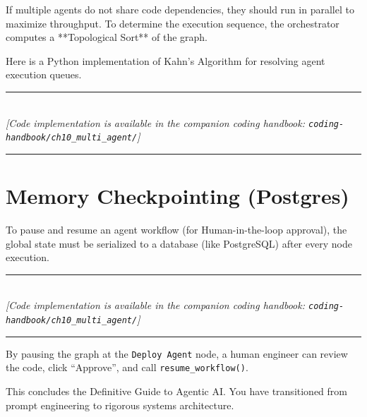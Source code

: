 If multiple agents do not share code dependencies, they should run in parallel to maximize throughput. To determine the execution sequence, the orchestrator computes a **Topological Sort** of the graph.

Here is a Python implementation of Kahn's Algorithm for resolving agent execution queues.


\begin{center}
\noindent\rule{0.6\textwidth}{0.4pt} \\
\vspace{0.3em}
\textit{[Code implementation is available in the companion coding handbook: \texttt{coding-handbook/ch10\_multi\_agent/}]} \\
\noindent\rule{0.6\textwidth}{0.4pt}
\end{center}


\section{Memory Checkpointing (Postgres)}

To pause and resume an agent workflow (for Human-in-the-loop approval), the global state must be serialized to a database (like PostgreSQL) after every node execution.


\begin{center}
\noindent\rule{0.6\textwidth}{0.4pt} \\
\vspace{0.3em}
\textit{[Code implementation is available in the companion coding handbook: \texttt{coding-handbook/ch10\_multi\_agent/}]} \\
\noindent\rule{0.6\textwidth}{0.4pt}
\end{center}


By pausing the graph at the \texttt{Deploy Agent} node, a human engineer can review the code, click ``Approve'', and call \texttt{resume\_workflow()}.

This concludes the Definitive Guide to Agentic AI. You have transitioned from prompt engineering to rigorous systems architecture.
